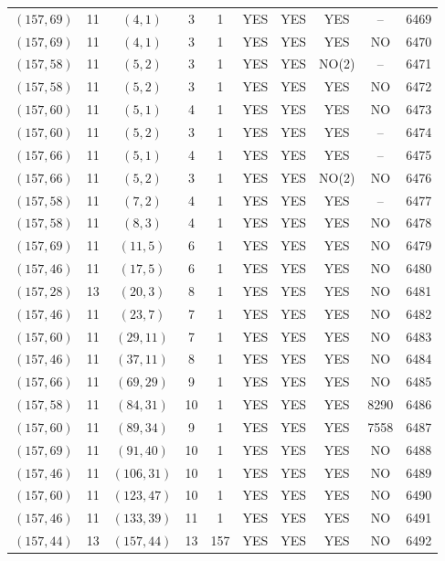\begin{longtable}{|c|c|c|c|c|c|c|c|c|c|}
$(157, 69)$ & 11 & $(4, 1)$ & 3 & 1 & YES & YES & YES & -- & 6469\\
$(157, 69)$ & 11 & $(4, 1)$ & 3 & 1 & YES & YES & YES & NO & 6470\\
$(157, 58)$ & 11 & $(5, 2)$ & 3 & 1 & YES & YES & NO(2) & -- & 6471\\
$(157, 58)$ & 11 & $(5, 2)$ & 3 & 1 & YES & YES & YES & NO & 6472\\
$(157, 60)$ & 11 & $(5, 1)$ & 4 & 1 & YES & YES & YES & NO & 6473\\
$(157, 60)$ & 11 & $(5, 2)$ & 3 & 1 & YES & YES & YES & -- & 6474\\
$(157, 66)$ & 11 & $(5, 1)$ & 4 & 1 & YES & YES & YES & -- & 6475\\
$(157, 66)$ & 11 & $(5, 2)$ & 3 & 1 & YES & YES & NO(2) & NO & 6476\\
$(157, 58)$ & 11 & $(7, 2)$ & 4 & 1 & YES & YES & YES & -- & 6477\\
$(157, 58)$ & 11 & $(8, 3)$ & 4 & 1 & YES & YES & YES & NO & 6478\\
$(157, 69)$ & 11 & $(11, 5)$ & 6 & 1 & YES & YES & YES & NO & 6479\\
$(157, 46)$ & 11 & $(17, 5)$ & 6 & 1 & YES & YES & YES & NO & 6480\\
$(157, 28)$ & 13 & $(20, 3)$ & 8 & 1 & YES & YES & YES & NO & 6481\\
$(157, 46)$ & 11 & $(23, 7)$ & 7 & 1 & YES & YES & YES & NO & 6482\\
$(157, 60)$ & 11 & $(29, 11)$ & 7 & 1 & YES & YES & YES & NO & 6483\\
$(157, 46)$ & 11 & $(37, 11)$ & 8 & 1 & YES & YES & YES & NO & 6484\\
$(157, 66)$ & 11 & $(69, 29)$ & 9 & 1 & YES & YES & YES & NO & 6485\\
$(157, 58)$ & 11 & $(84, 31)$ & 10 & 1 & YES & YES & YES & 8290 & 6486\\
$(157, 60)$ & 11 & $(89, 34)$ & 9 & 1 & YES & YES & YES & 7558 & 6487\\
$(157, 69)$ & 11 & $(91, 40)$ & 10 & 1 & YES & YES & YES & NO & 6488\\
$(157, 46)$ & 11 & $(106, 31)$ & 10 & 1 & YES & YES & YES & NO & 6489\\
$(157, 60)$ & 11 & $(123, 47)$ & 10 & 1 & YES & YES & YES & NO & 6490\\
$(157, 46)$ & 11 & $(133, 39)$ & 11 & 1 & YES & YES & YES & NO & 6491\\
$(157, 44)$ & 13 & $(157, 44)$ & 13 & 157 & YES & YES & YES & NO & 6492\\

\end{longtable}
